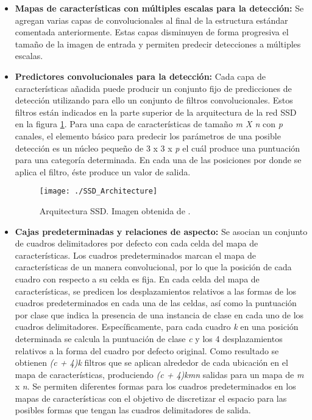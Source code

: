 \documentclass[a4paper, 12pt, spanish, chapterprefix, numbers=noenddot]{book}
\begin{document}
\begin{itemize}
\item \textbf{Mapas de características con múltiples escalas para la detección:}  Se agregan varias capas de convolucionales al final de la estructura estándar comentada anteriormente. Estas capas disminuyen de forma progresiva el tamaño de la imagen de entrada y permiten predecir detecciones a múltiples escalas. 

\item \textbf{Predictores convolucionales para la detección:}  Cada capa de características añadida puede producir un conjunto fijo de predicciones de detección utilizando para ello un conjunto de filtros convolucionales. Estos filtros están indicados en la parte superior de la arquitectura de la red SSD en la figura \ref{ArquitecturaSSD}. Para una capa de características de tamaño \textit{m X n} con \textit{p} canales, el elemento básico para predecir los parámetros de una posible detección es un núcleo pequeño de 3 x 3 x \textit{p} el cuál produce una puntuación para una categoría determinada. En cada una de las posiciones por donde se aplica el filtro, éste produce un valor de salida.

\begin{figure}[H]
\begin{center}
\texttt{[image: ./SSD\_Architecture]}
\caption{Arquitectura SSD. Imagen obtenida de \cite{SSD}.}
\label{ArquitecturaSSD}
\end{center}
\end{figure}

\item \textbf{Cajas predeterminadas y relaciones de aspecto:} Se asocian un conjunto de cuadros delimitadores por defecto con cada celda del mapa de características. Los cuadros predeterminados marcan el mapa de características de un manera convolucional, por lo que la posición de cada cuadro con respecto a su celda es fija. En cada celda del mapa de características, se predicen los desplazamientos relativos a las formas de los cuadros predeterminados en cada una de las celdas, así como la puntuación por clase que indica la presencia de una instancia de clase en cada uno de los cuadros delimitadores. Específicamente, para cada cuadro \textit{k} en una posición determinada se calcula la puntuación de clase \textit{c} y los 4 desplazamientos relativos a la forma del cuadro por defecto original. Como resultado se obtienen \textit{(c + 4)k} filtros que se aplican alrededor de cada ubicación en el mapa de características, produciendo \textit{(c + 4)kmn} salidas para un mapa de \textit{m} x \textit{n}. Se permiten diferentes formas para los cuadros predeterminados en los mapas de características con el objetivo de discretizar el espacio para las posibles formas que tengan las cuadros delimitadores de salida.
\end{itemize}
\end{document}
